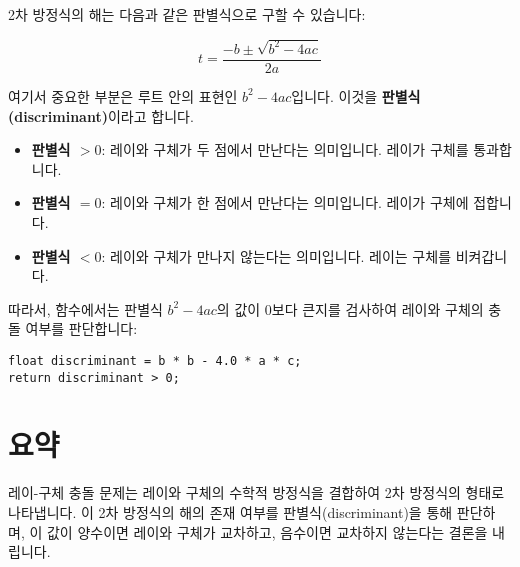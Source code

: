 \documentclass[a4paper, 12pt]{article}
\begin{document}
2차 방정식의 해는 다음과 같은 판별식으로 구할 수 있습니다:

\[
t = \frac{-b \pm \sqrt{b^2 - 4ac}}{2a}
\]

여기서 중요한 부분은 루트 안의 표현인 \(b^2 - 4ac\)입니다. 이것을 \textbf{판별식(discriminant)}이라고 합니다.

\begin{itemize}
    \item \textbf{판별식 \(> 0\)}: 레이와 구체가 두 점에서 만난다는 의미입니다. 레이가 구체를 통과합니다.
    \item \textbf{판별식 \(= 0\)}: 레이와 구체가 한 점에서 만난다는 의미입니다. 레이가 구체에 접합니다.
    \item \textbf{판별식 \(< 0\)}: 레이와 구체가 만나지 않는다는 의미입니다. 레이는 구체를 비켜갑니다.
\end{itemize}

따라서, 함수에서는 판별식 \(b^2 - 4ac\)의 값이 0보다 큰지를 검사하여 레이와 구체의 충돌 여부를 판단합니다:

\begin{verbatim}
float discriminant = b * b - 4.0 * a * c;
return discriminant > 0;
\end{verbatim}

\section{요약}

레이-구체 충돌 문제는 레이와 구체의 수학적 방정식을 결합하여 2차 방정식의 형태로 나타냅니다. 이 2차 방정식의 해의 존재 여부를 판별식(discriminant)을 통해 판단하며, 이 값이 양수이면 레이와 구체가 교차하고, 음수이면 교차하지 않는다는 결론을 내립니다.
\end{document}
